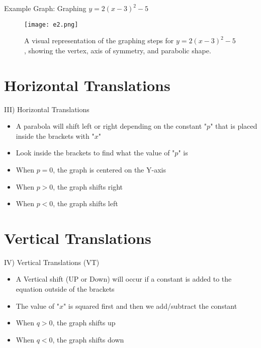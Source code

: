 \documentclass[aspectratio=169]{beamer}
\begin{document}
\begin{frame}{Example Graph: Graphing $y = 2(x-3)^2 - 5$}
    \begin{figure}[H]
        \centering
        \texttt{[image: e2.png]}
        \caption{A visual representation of the graphing steps for $y = 2(x-3)^2 - 5$, showing the vertex, axis of symmetry, and parabolic shape.}
    \end{figure}
\end{frame}

\section{Horizontal Translations}

\begin{frame}{III) Horizontal Translations}
    \begin{tcolorbox}[colback=lightgray,colframe=primary,title=Key Concepts]
        \footnotesize
        \begin{itemize}
            \item A parabola will shift left or right depending on the constant "$p$" that is placed inside the brackets with "$x$"
            \item Look inside the brackets to find what the value of "$p$" is
            \item When $p=0$, the graph is centered on the Y-axis
            \item When $p>0$, the graph shifts right
            \item When $p<0$, the graph shifts left
        \end{itemize}
    \end{tcolorbox}
\end{frame}

\section{Vertical Translations}

\begin{frame}{IV) Vertical Translations (VT)}
    \begin{tcolorbox}[colback=lightgray,colframe=primary,title=Key Concepts]
        \footnotesize
        \begin{itemize}
            \item A Vertical shift (UP or Down) will occur if a constant is added to the equation outside of the brackets
            \item The value of "$x$" is squared first and then we add/subtract the constant
            \item When $q>0$, the graph shifts up
            \item When $q<0$, the graph shifts down
        \end{itemize}
    \end{tcolorbox}
\end{frame}
\end{document}

